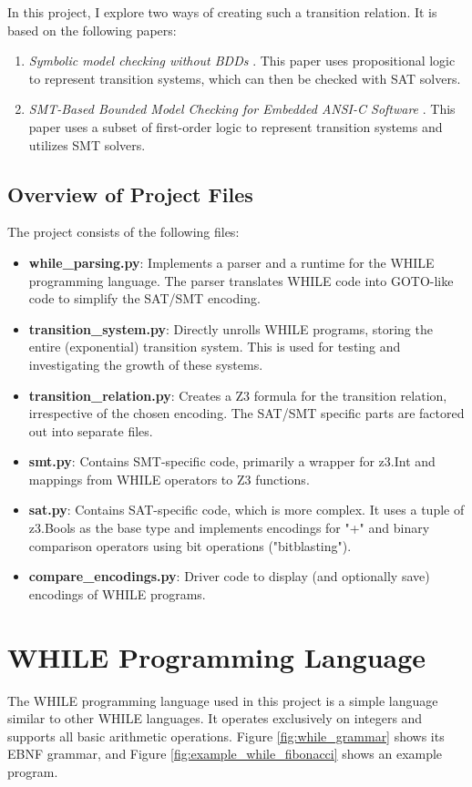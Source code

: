 \documentclass[sigconf,natbib=false]{acmart}
\begin{document}
In this project, I explore two ways of creating such a transition relation. It is based on the following papers:
\begin{enumerate}
\item \textit{Symbolic model checking without BDDs} \cite{biere1999symbolic}. This paper uses propositional logic to represent transition systems, which can then be checked with SAT solvers.
\item \textit{SMT-Based Bounded Model Checking for Embedded ANSI-C Software} \cite{cordeiro2011smt}. This paper uses a subset of first-order logic to represent transition systems and utilizes SMT solvers.
\end{enumerate}

\subsection{Overview of Project Files}
The project consists of the following files:
\begin{itemize}
\item \textbf{while\_parsing.py}: Implements a parser and a runtime for the WHILE programming language. The parser translates WHILE code into GOTO-like code to simplify the SAT/SMT encoding.
\item \textbf{transition\_system.py}: Directly unrolls WHILE programs, storing the entire (exponential) transition system. This is used for testing and investigating the growth of these systems.
\item \textbf{transition\_relation.py}: Creates a Z3 formula for the transition relation, irrespective of the chosen encoding. The SAT/SMT specific parts are factored out into separate files.
\item \textbf{smt.py}: Contains SMT-specific code, primarily a wrapper for z3.Int and mappings from WHILE operators to Z3 functions.
\item \textbf{sat.py}: Contains SAT-specific code, which is more complex. It uses a tuple of z3.Bools as the base type and implements encodings for "+" and binary comparison operators using bit operations ("bitblasting").
\item \textbf{compare\_encodings.py}: Driver code to display (and optionally save) encodings of WHILE programs.
\end{itemize}

\section{WHILE Programming Language}
The WHILE programming language used in this project is a simple language similar to other WHILE languages. It operates exclusively on integers and supports all basic arithmetic operations. Figure \ref{fig:while_grammar} shows its EBNF grammar, and Figure \ref{fig:example_while_fibonacci} shows an example program.
\end{document}
